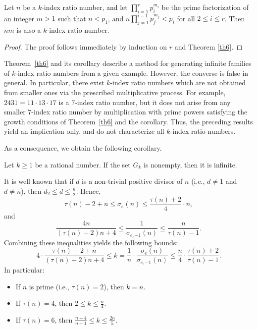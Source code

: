 \documentclass[12pt,reqno]{article}
\begin{document}
\begin{corollary}
Let $n$ be a $k$-index ratio number, and let $\prod_{i=1}^{r}p_i^{m_i}$ be the prime factorization of an integer $m > 1$ such that $n < p_1$, and $n \prod_{j=1}^{i-1}p_j^{m_j} < p_i$ for all $2 \leq i \leq r$. Then $nm$ is also a $k$-index ratio number.
\end{corollary}

\begin{proof}
The proof follows immediately by induction on $r$ and Theorem \ref{th6}.
\end{proof}

\begin{remark}
Theorem~\ref{th6} and its corollary describe a method for generating
infinite families of $k$-index ratio numbers from a given example.
However, the converse is false in general. 
In particular, there exist $k$-index ratio numbers which are not obtained
from smaller ones via the prescribed multiplicative process.
For example, $2431=11\cdot13\cdot17$ is a $7$-index ratio number,
but it does not arise from any smaller $7$-index ratio number by
multiplication with prime powers satisfying the growth conditions
of Theorem~\ref{th6} and the corollary. Thus, the preceding results yield an implication only, and do not
characterize all $k$-index ratio numbers.
\end{remark}

As a consequence, we obtain the following corollary.

\begin{corollary}
Let \( k\geq 1 \) be a rational number. If the set $G_k$ is nonempty, then it is infinite.
\end{corollary}

It is well known that if \( d \) is a non-trivial positive divisor of \( n \) (i.e., \( d \ne 1 \) and \( d \ne n \)), then $d_2\leq d\leq\frac{n}{2}$. Hence,
\[
\tau(n) - 2 + n \leq \sigma_e(n) \leq \frac{\tau(n) + 2}{4} \cdot n,
\]
and
\[
\frac{4n}{(\tau(n) - 2)n + 4} \leq \frac{1}{\sigma_{e,-1}(n)} \leq \frac{n}{\tau(n) - 1}.
\]
Combining these inequalities yields the following bounds:
\[
4 \cdot \frac{\tau(n) - 2 + n}{(\tau(n) - 2)n + 4} \leq k = \frac{1}{n} \cdot \frac{\sigma_e(n)}{\sigma_{e,-1}(n)} \leq \frac{n}{4} \cdot \frac{\tau(n) + 2}{\tau(n) - 1}.
\]
In particular:
\begin{itemize}
  \item If \( n \) is prime (i.e., $\tau(n) =2$), then \( k = n \).
  \item If \( \tau(n) = 4 \), then \( 2 \leq k \leq \frac{n}{4} \).
  \item If \( \tau(n) = 6 \), then \( \frac{n+4}{n+1} \leq k \leq \frac{2n}{5} \).
\end{itemize}
\end{document}
